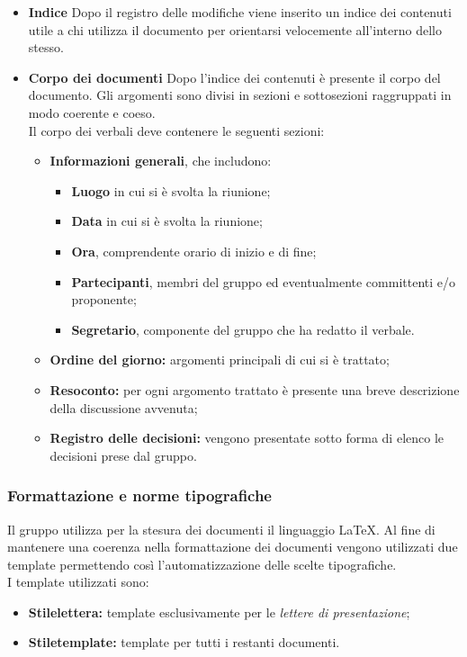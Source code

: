 \begin{itemize}
\item\textbf{Indice}
Dopo il registro delle modifiche viene inserito un indice dei contenuti utile a chi utilizza il documento per orientarsi velocemente all'interno dello stesso.

\item\textbf{Corpo dei documenti}
Dopo l'indice dei contenuti è presente il corpo del documento. Gli argomenti sono divisi in sezioni e sottosezioni raggruppati in modo coerente e coeso.\\
Il corpo dei verbali deve contenere le seguenti sezioni:
\begin{itemize}
	\item \textbf{Informazioni generali}, che includono:
		\begin{itemize}
			\item \textbf{Luogo} in cui si è svolta la riunione;
			\item \textbf{Data} in cui si è svolta la riunione;
			\item \textbf{Ora}, comprendente orario di inizio e di fine;
			\item \textbf{Partecipanti}, membri del gruppo ed eventualmente committenti e/o proponente;
			\item \textbf{Segretario}, componente del gruppo che ha redatto il verbale.
		\end{itemize}
	\item \textbf{Ordine del giorno:} argomenti principali di cui si è trattato;
	\item \textbf{Resoconto:} per ogni argomento trattato è presente una breve descrizione della discussione avvenuta;
	\item \textbf{Registro delle decisioni:} vengono presentate sotto forma di elenco le decisioni prese dal gruppo.
\end{itemize}
\end{itemize}

\subsubsection{Formattazione e norme tipografiche}
Il gruppo utilizza per la stesura dei documenti il linguaggio \LaTeX. Al fine di mantenere una coerenza nella formattazione dei documenti vengono utilizzati due template permettendo così l'automatizzazione delle scelte tipografiche.\\
I template utilizzati sono:
\begin{itemize}
	\item \textbf{Stilelettera:} template esclusivamente per le \textit{lettere di presentazione};
	\item \textbf{Stiletemplate:} template per tutti i restanti documenti.
\end{itemize}

